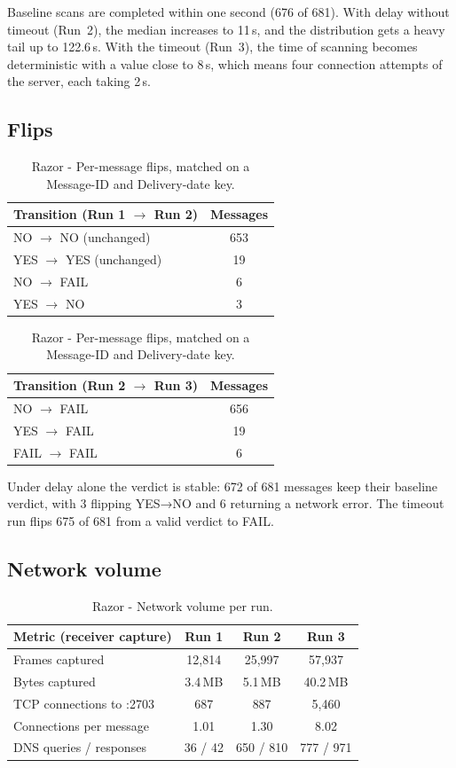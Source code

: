 Baseline scans are completed within one second (676 of 681). With delay without timeout
(Run~2), the median increases to 11\,s, and the distribution gets a heavy tail up
to 122.6\,s. With the timeout (Run~3), the time of scanning becomes deterministic
with a value close to 8\,s, which means four connection attempts of the server,
each taking 2\,s.

\subsection{Flips}
\begin{table}[H]\centering
\small
\begin{tabular}{@{}lc@{}}
\toprule
Transition (Run 1 $\to$ Run 2) & Messages \\
\midrule
NO $\to$ NO (unchanged)   & 653 \\
YES $\to$ YES (unchanged) & 19 \\
NO $\to$ FAIL             & 6 \\
YES $\to$ NO              & 3 \\
\bottomrule
\end{tabular}
\hfill
\begin{tabular}{@{}lc@{}}
\toprule
Transition (Run 2 $\to$ Run 3) & Messages \\
\midrule
NO $\to$ FAIL   & 656 \\
YES $\to$ FAIL  & 19 \\
FAIL $\to$ FAIL & 6 \\
\bottomrule
\end{tabular}
\caption{Razor - Per-message flips, matched on a Message-ID and Delivery-date key.}
\label{tab:razor-flips}
\end{table}

Under delay alone the verdict is stable: 672 of 681 messages keep their baseline verdict, with 3 flipping YES→NO and 6 returning a network error. The timeout run flips 675 of 681 from a valid verdict to FAIL.


\subsection{Network volume}

\begin{table}[H]\centering
\small
\begin{tabular}{@{}lccc@{}}
\toprule
Metric (receiver capture) & Run 1 & Run 2 & Run 3 \\
\midrule
Frames captured              & 12{,}814 & 25{,}997 & 57{,}937 \\
Bytes captured               & 3.4\,MB  & 5.1\,MB  & 40.2\,MB \\
TCP connections to :2703     & 687      & 887      & 5{,}460 \\
Connections per message      & 1.01     & 1.30     & 8.02 \\
DNS queries / responses      & 36 / 42  & 650 / 810 & 777 / 971 \\
\bottomrule
\end{tabular}
\caption{Razor - Network volume per run.}
\label{tab:razor-network}
\end{table}


